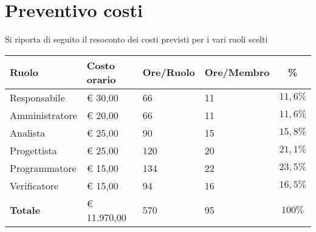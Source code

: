 \section{Preventivo costi}
Si riporta di seguito il resoconto dei costi previsti per i vari ruoli scelti

\begin{center}
    \begin{tabular}{|l|l|l|l|c|}
        \hline
        \textbf{Ruolo} & \textbf{Costo orario} & \textbf{Ore/Ruolo} & \textbf{Ore/Membro} & \textbf{\%} \\
        \hline
        Responsabile & \euro{} 30,00 & 66 & 11 & $11,6\%$ \\
        \hline
        Amministratore & \euro{} 20,00 & 66 & 11 & $11,6\%$ \\
        \hline
        Analista & \euro{} 25,00 & 90 & 15 & $15,8\%$ \\
        \hline
        Progettista & \euro{} 25,00 & 120 & 20 & $21,1\%$ \\
        \hline
        Programmatore & \euro{} 15,00 & 134 & 22 & $23,5\%$ \\
        \hline
        Verificatore & \euro{} 15,00 & 94 & 16 & $16,5\%$ \\
        \hline
        \textbf{Totale} & \euro{} 11.970,00 & 570 & 95 & $100\%$ \\
        \hline
    \end{tabular}
\end{center}
